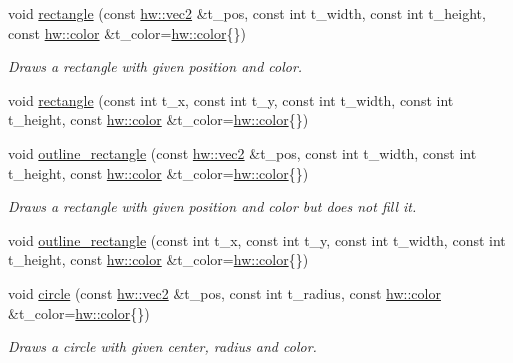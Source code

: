 \begin{DoxyCompactItemize}
\item 
void \mbox{\hyperlink{namespacedummy__api_acb6344e33577af291978e41b3322c14b}{rectangle}} (const \mbox{\hyperlink{structhw_1_1vec2}{hw\+::vec2}} \&t\+\_\+pos, const int t\+\_\+width, const int t\+\_\+height, const \mbox{\hyperlink{structhw_1_1color}{hw\+::color}} \&t\+\_\+color=\mbox{\hyperlink{structhw_1_1color}{hw\+::color}}\{\})
\begin{DoxyCompactList}\small\item\em Draws a rectangle with given position and color. \end{DoxyCompactList}\item 
void \mbox{\hyperlink{namespacedummy__api_a6409e8fb0ec9267490a4671efb23c536}{rectangle}} (const int t\+\_\+x, const int t\+\_\+y, const int t\+\_\+width, const int t\+\_\+height, const \mbox{\hyperlink{structhw_1_1color}{hw\+::color}} \&t\+\_\+color=\mbox{\hyperlink{structhw_1_1color}{hw\+::color}}\{\})
\item 
void \mbox{\hyperlink{namespacedummy__api_a4e2f013ea9cf0109e20c1fa82e8ec65a}{outline\+\_\+rectangle}} (const \mbox{\hyperlink{structhw_1_1vec2}{hw\+::vec2}} \&t\+\_\+pos, const int t\+\_\+width, const int t\+\_\+height, const \mbox{\hyperlink{structhw_1_1color}{hw\+::color}} \&t\+\_\+color=\mbox{\hyperlink{structhw_1_1color}{hw\+::color}}\{\})
\begin{DoxyCompactList}\small\item\em Draws a rectangle with given position and color but does not fill it. \end{DoxyCompactList}\item 
void \mbox{\hyperlink{namespacedummy__api_a07cc87a9879b2f59afb9c2d41904c024}{outline\+\_\+rectangle}} (const int t\+\_\+x, const int t\+\_\+y, const int t\+\_\+width, const int t\+\_\+height, const \mbox{\hyperlink{structhw_1_1color}{hw\+::color}} \&t\+\_\+color=\mbox{\hyperlink{structhw_1_1color}{hw\+::color}}\{\})
\item 
\mbox{\label{namespacedummy__api_aa74109ab06d357bdb17ade66df53e123}} 
void \mbox{\hyperlink{namespacedummy__api_aa74109ab06d357bdb17ade66df53e123}{circle}} (const \mbox{\hyperlink{structhw_1_1vec2}{hw\+::vec2}} \&t\+\_\+pos, const int t\+\_\+radius, const \mbox{\hyperlink{structhw_1_1color}{hw\+::color}} \&t\+\_\+color=\mbox{\hyperlink{structhw_1_1color}{hw\+::color}}\{\})
\begin{DoxyCompactList}\small\item\em Draws a circle with given center, radius and color. \end{DoxyCompactList}\item 

\end{DoxyCompactItemize}
